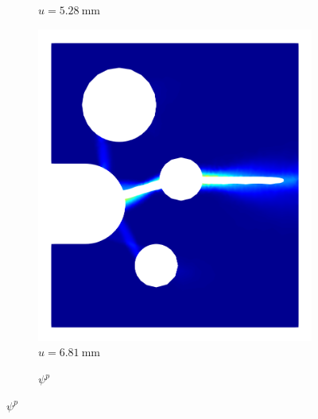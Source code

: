 \begin{figure}[!htb]
\begin{subfigure}{0.17\textwidth}
    \caption{$u = \SI{5.28}{\milli\meter}$}
    \label{fig: Chapter5/SFC/Wp_2}
  \end{subfigure}
  \hspace{0.03\textwidth}
  \begin{subfigure}{0.17\textwidth}
    \centering
    \includegraphics[width=\textwidth,scale=0.5]{Chapter5/figures/SFC/W_pl_3}
    \caption{$u = \SI{6.81}{\milli\meter}$}
    \label{fig: Chapter5/SFC/Wp_3}
  \end{subfigure}
  \begin{subfigure}{0.04\textwidth}
    \centering
    \caption*{$\psi^p$}

\end{subfigure}
\end{figure}
